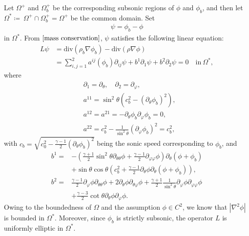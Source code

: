 \documentclass[10pt,a4paper]{amsart}
\newcommand{\di}{\mathrm{div}}
\numberwithin{equation}{section}
\begin{document}
Let $\Omega^+ $ and $\Omega^{+}_{b}$ be the corresponding subsonic regions of $\phi$ and $\phi_b$, and then let $\Omega^{*}\coloneqq ~\Omega^+ \cap \Omega^{+}_{b}= \Omega^+$ be the common domain. Set
		\begin{align*}
		\psi=\phi_b-\phi
	\end{align*}
in $\Omega^*$. From $\eqref{mass conservation}$, $\psi$ satisfies the following linear equation:
	\begin{align}
		L\psi&=\di (\rho_b\nabla \phi_b)-\di(\rho\nabla \phi)\nonumber\\
		&=\sum_{i,j=1}^{2}a^{ij}(\phi_b)\partial_{ij}\psi +b^1\partial_1\psi +b^2\partial_2\psi=0\quad\text{in}~\Omega^*,
	\end{align}
where
	\begin{align*}
	&\partial_1=\partial_\theta, \quad \partial_2=\partial_\varphi,\\
	&a^{11}=\sin^2\theta(c_b^2-(\partial_{\theta}\phi_b)^2),\\
	&a^{12}=a^{21}=-\partial_\theta\phi_b\partial_\varphi\phi_b=0,\\
	&a^{22}=c_b^2-\frac{1}{\sin^2\theta}(\partial_\varphi\phi_b)^2=c^2_b,
	\end{align*}
with $c_b=\sqrt{c^2_0-\frac{\gamma-1}{2}(\partial_{\theta}\phi_b)^2}$ being the sonic speed corresponding to $\phi_b$, and
\begin{align}
  b^{1}= & -\left(\frac{\gamma+1}{2} \sin^{2}\theta  \partial_{\theta \theta} \phi+\frac{\gamma-1}{2} \partial_{\varphi \varphi} \phi\right) \partial_{\theta}\left(\phi+\phi_{b}\right) \nonumber\\& +\sin\theta \cos \theta \left(c_{b}^{2}+\frac{\gamma-1}{2} \partial_{\theta} \phi \partial_{\theta}\left(\phi+\phi_{b}\right)\right), \\
  b^{2}= & \frac{\gamma-1}{2} \partial_{\varphi} \phi \partial_{\theta\theta} \phi+2 \partial_{\theta} \phi \partial_{\theta\varphi} \phi+\frac{\gamma+1}{2} \frac{1}{\sin^{2}\theta} \partial_{\varphi} \phi \partial_{\varphi\varphi} \phi \nonumber\\& +\frac{\gamma-3}{2} \cot\theta \partial_{\theta} \phi \partial_{\varphi} \phi .
\end{align}
Owing to the boundedness of $\Omega$ and the assumption $\phi \in C^2$, we know that $|\nabla^2\phi|$ is bounded in $\Omega^*$. Moreover, since $\phi_b$ is strictly subsonic, the operator $L$ is uniformly elliptic in $\Omega^*$.
\end{document}
